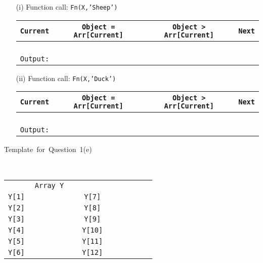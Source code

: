 \begin{enumerate}
\item[(i)] Function call: \texttt{Fn(X,'Sheep')}

\noindent %
\begin{tabular}{|c|c|c|c|}
\hline 
\texttt{Current} & \texttt{Object = Arr{[}Current{]}} & \texttt{Object > Arr{[}Current{]}} & \texttt{Next}\tabularnewline
\hline 
 &  &  & \tabularnewline
\hline 
 &  &  & \tabularnewline
\hline 
 &  &  & \tabularnewline
\hline 
 &  &  & \tabularnewline
\hline 
\multicolumn{4}{|l|}{\texttt{Output:}}\tabularnewline
\hline 
\end{tabular}
\item[(ii)] Function call: \texttt{Fn(X,'Duck')}
\noindent \begin{flushleft}
\begin{tabular}{|c|c|c|c|}
\hline 
\texttt{Current} & \texttt{Object = Arr{[}Current{]}} & \texttt{Object > Arr{[}Current{]}} & \texttt{Next}\tabularnewline
\hline 
 &  &  & \tabularnewline
\hline 
 &  &  & \tabularnewline
\hline 
 &  &  & \tabularnewline
\hline 
 &  &  & \tabularnewline
\hline 
\multicolumn{4}{|l|}{\texttt{Output:}}\tabularnewline
\hline 
\end{tabular}
\par\end{flushleft}
\end{enumerate}
\begin{description}
\item [{Template~for~Question~1(e)}]~
\end{description}
\noindent \begin{center}
\begin{tabular}{c|c|cc|c|}
\multicolumn{1}{c}{} & \multicolumn{1}{c}{\texttt{Array Y}} &  & \multicolumn{1}{c}{} & \multicolumn{1}{c}{}\tabularnewline
\cline{2-2} \cline{5-5} 
\texttt{Y{[}1{]}} & \texttt{\textcolor{white}{'Rat'}} &  & \texttt{Y{[}7{]}} & \texttt{\textcolor{white}{'Tiger'}}\tabularnewline
\cline{2-2} \cline{5-5} 
\texttt{Y{[}2{]}} & \texttt{\textcolor{white}{'Monkey'}} &  & \texttt{Y{[}8{]}} & \texttt{\textcolor{white}{'Dog'}}\tabularnewline
\cline{2-2} \cline{5-5} 
\texttt{Y{[}3{]}} & \texttt{\textcolor{white}{'Snake'}} &  & \texttt{Y{[}9{]}} & \texttt{\textcolor{white}{'Horse'}}\tabularnewline
\cline{2-2} \cline{5-5} 
\texttt{Y{[}4{]}} & \texttt{\textcolor{white}{'Dragon'}} &  & \texttt{Y{[}10{]}} & \texttt{\textcolor{white}{'Ox'}}\tabularnewline
\cline{2-2} \cline{5-5} 
\texttt{Y{[}5{]}} & \texttt{\textcolor{white}{'Pig'}} &  & \texttt{Y{[}11{]}} & \texttt{\textcolor{white}{'Rabbit'}}\tabularnewline
\cline{2-2} \cline{5-5} 
\texttt{Y{[}6{]}} & \texttt{\textcolor{white}{'Sheep'}} &  & \texttt{Y{[}12{]}} & \texttt{\textcolor{white}{'Rooster'}}\tabularnewline
\cline{2-2} \cline{5-5} 
\end{tabular}
\par\end{center}